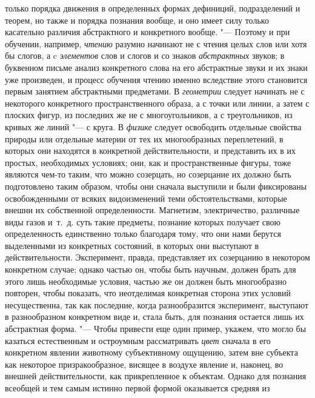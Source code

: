 {{только порядка движения в определенных формах дефиниций, подразделений и
теорем, но также и порядка познания вообще, и оно имеет силу только
касательно различия абстрактного и конкретного
вообще.
"--- Поэтому и при обучении, например,
{\em чтению} разумно
начинают не с чтения целых слов или хотя бы слогов, а c
{\em элементов} слов и
слогов и со знаков {\em абстрактных}
звуков; в буквенном письме анализ конкретного слова на его
абстрактные звуки и их знаки уже произведен, и процесс обучения чтению
именно вследствие этого становится первым занятием абстрактными предметами.
В {\em геометрии} следует
начинать не с некоторого конкретного пространственного образа, а с точки
или линии, а затем с плоских фигур, из последних же не с многоугольников, а
с треугольников, из кривых же линий "--- с круга. В
{\em физике} следует
освободить отдельные свойства природы или отдельные материи от тех их
многообразных переплетений, в которых они находятся в конкретной
действительности, и представить их в их простых, необходимых условиях; они,
как и пространственные фигуры, тоже являются чем-то таким, что можно
созерцать, но созерцание их должно быть подготовлено таким образом, чтобы
они сначала выступили и были фиксированы освобожденными от всяких
видоизменений теми обстоятельствами, которые внешни их
собственной определенности. Магнетизм, электричество, различные виды газов
и~т.~д. суть такие предметы, познание которых получает свою определенность
единственно только благодаря тому, что они нами берутся выделенными из
конкретных состояний, в которых они выступают в действительности.
Эксперимент, правда, представляет их созерцанию в некотором конкретном
случае; однако частью он, чтобы быть научным, должен брать для этого лишь
необходимые условия, частью же он должен быть многообразно повторен, чтобы
показать, что неотделимая конкретная сторона этих условий несущественна,
так как последние, когда разнообразится эксперимент, выступают в
разнообразном конкретном виде и, стала быть, для познания остается лишь их
абстрактная форма. "--- Чтобы привести еще один пример, укажем,
что могло бы казаться естественным и остроумным рассматривать
{\em цвет} сначала в его
конкретном явлении животному субъективному ощущению, затем вне субъекта как
некоторое призракообразное, висящее в воздухе явление и, наконец, во
внешней действительности, как прикрепленное к объектам. Однако для познания
всеобщей и тем самым истинно первой формой оказывается средняя из
}}
